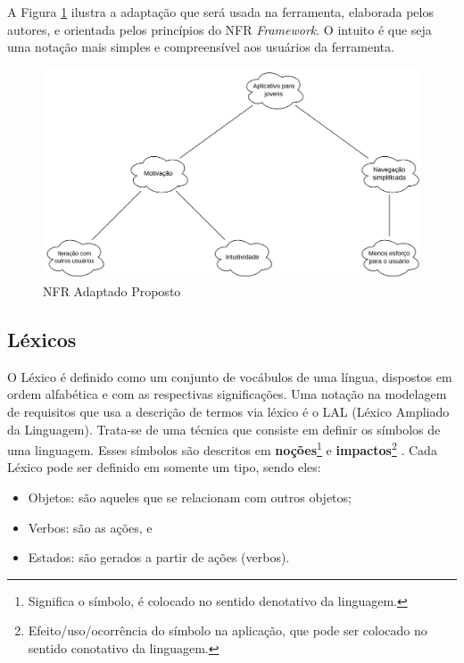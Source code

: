 A Figura \ref{fig:nfr_example} ilustra a adaptação que será usada na ferramenta, elaborada pelos autores, e orientada pelos princípios do NFR \textit{Framework}. O intuito é que seja uma notação mais simples e compreensível aos usuários da ferramenta.

\begin{figure}[H]
    \begin{center}
        \caption{NFR Adaptado Proposto}
        \label{fig:nfr_example}
        \includegraphics[scale=0.60]{figuras/Embasamento/nfr_adaptado.png}
    \end{center}
\end{figure}


\subsection{Léxicos}

\label{sec:lexicos}

O Léxico é definido como um conjunto de vocábulos de uma língua, dispostos em ordem alfabética e com as respectivas significações. Uma notação na modelagem de requisitos que usa a descrição de termos via léxico é o LAL (Léxico Ampliado da Linguagem). Trata-se de uma técnica que consiste em definir os símbolos de uma linguagem. Esses símbolos são descritos em \textbf{noções}\footnote{Significa o símbolo, é colocado no sentido denotativo da linguagem.} e \textbf{impactos}\footnote{Efeito/uso/ocorrência do símbolo na aplicação, que pode ser colocado no sentido conotativo da linguagem.} \cite{leite1993strategy}. Cada Léxico pode ser definido em somente um tipo, sendo eles:

\begin{itemize}
    \item Objetos: são aqueles que se relacionam com outros objetos;
    \item Verbos: são as ações, e
    \item Estados: são gerados a partir de ações (verbos).
\end{itemize}

